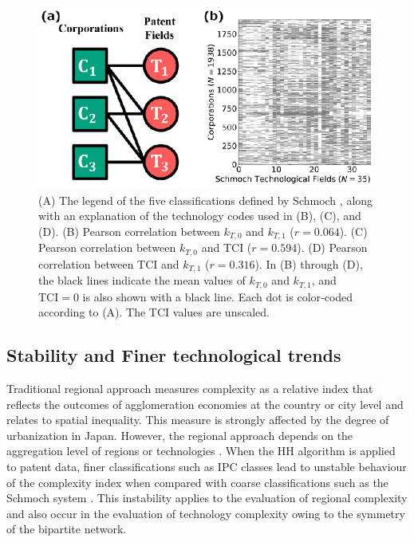 \documentclass[fleqn,10pt]{wlscirep}
\begin{document}
\begin{figure}[ht]
    \centering
    \includegraphics[scale=0.75]{Figs/Fig1.eps}
    \caption{(A) The legend of the five classifications defined by Schmoch \cite{Schmoch2008}, along with an explanation of the technology codes used in (B), (C), and (D).
    (B) Pearson correlation between \(k_{T,0}\) and \(k_{T,1}\) (\(r=0.064\)).
    (C) Pearson correlation between \(k_{T,0}\) and TCI (\(r=0.594\)).
    (D) Pearson correlation between TCI and \(k_{T,1}\) (\(r=0.316\)).
    In (B) through (D), the black lines indicate the mean values of \(k_{T,0}\) and \(k_{T,1}\), and \(\text{TCI} = 0\) is also shown with a black line. Each dot is color‐coded according to (A). The TCI values are unscaled.
    }
    \label{fig:scatter}
\end{figure}

\subsection*{Stability and Finer technological trends}

Traditional regional approach measures complexity as a relative index that reflects the outcomes of agglomeration economies at the country or city level \cite{hartmann2024economic} and relates to spatial inequality. 
This measure is strongly affected by the degree of urbanization in Japan. 
However, the regional approach depends on the aggregation level of regions or technologies \cite{Hidalgo2021}. 
When the HH algorithm is applied to patent data, finer classifications such as IPC classes lead to unstable behaviour of the complexity index when compared with coarse classifications such as the Schmoch system \cite{PintarEssletzbichler2022}. 
This instability applies to the evaluation of regional complexity and also occur in the evaluation of technology complexity owing to the symmetry of the bipartite network.
\end{document}
